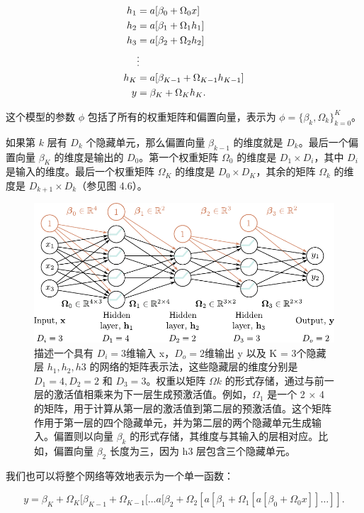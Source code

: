 \documentclass[lang=cn,newtx,10pt,scheme=chinese]{elegantbook}
\begin{document}
\begin{align}
	h_1 &= a[\beta_0 + \Omega_0 x] \notag \\
	h_2 &= a[\beta_1 + \Omega_1 h_1] \notag \\
	h_3 &= a[\beta_2 + \Omega_2 h_2] \notag \\
	& \vdots \notag \\
	h_K &= a[\beta_{K-1} + \Omega_{K-1}h_{K-1}] \notag \\
	y &= \beta_K + \Omega_K h_K. 
\end{align}

这个模型的参数 \(\phi\) 包括了所有的权重矩阵和偏置向量，表示为 \(\phi = \{ \beta_k, \Omega_k \}^{K}_{k=0}\)。

如果第 \(k\) 层有 \(D_k\) 个隐藏单元，那么偏置向量 \(\beta_{k-1}\) 的维度就是 \(D_k\)。最后一个偏置向量 \(\beta_K\) 的维度是输出的 \(D_0\)。第一个权重矩阵 \(\Omega_0\) 的维度是 \(D_1 \times D_i\)，其中 \(D_i\) 是输入的维度。最后一个权重矩阵 \(\Omega_K\) 的维度是 \(D_0 \times D_K\)，其余的矩阵 \(\Omega_k\) 的维度是 \(D_{k+1} \times D_k\)（参见图 4.6）。

\begin{figure}[ht!]
	\centering
	\includegraphics[width=0.7\linewidth]{PDFFigures/UDLChap4PDF/DeepKLayer.pdf}
	\caption{描述一个具有 \(D_i = 3\)维输入 x，\(D_o = 2\)维输出 y 以及 K = 3个隐藏层 \(h_1, h_2, h3\) 的网络的矩阵表示法，这些隐藏层的维度分别是 \(D_1 = 4, D_2 = 2\) 和 \(D_3 = 3\)。权重以矩阵 \(\Omega k\) 的形式存储，通过与前一层的激活值相乘来为下一层生成预激活值。例如，\(\Omega_1\) 是一个 2 × 4 的矩阵，用于计算从第一层的激活值到第二层的预激活值。这个矩阵作用于第一层的四个隐藏单元，并为第二层的两个隐藏单元生成输入。偏置则以向量 \(\beta_k\) 的形式存储，其维度与其输入的层相对应。比如，偏置向量 \(\beta_2\) 长度为三，因为 h3 层包含三个隐藏单元。}
\end{figure}

我们也可以将整个网络等效地表示为一个单一函数：


\begin{equation}
y = \beta_K + \Omega_K [\beta_{K-1} + \Omega_{K-1} [ \ldots a[\beta_2 + \Omega_2 [a[\beta_1 + \Omega_1 [a[\beta_0 + \Omega_0 x]] \ldots ]]. 
\end{equation}
\end{document}
